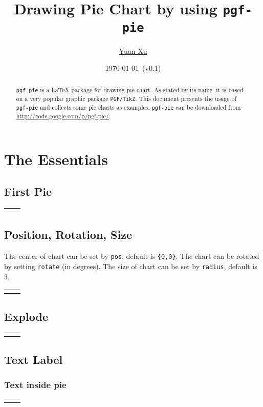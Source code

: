 \documentclass{article}
\newcommand{\demo}[2][1]{
  \begin{center}
  \begin{tabular}{cc}
    \begin{minipage}{.49\linewidth}
      \centering
      \resizebox{#1\linewidth}{!}{
        
      }
    \end{minipage}
    &
    \begin{minipage}{.45\linewidth}
      
    \end{minipage}
  \end{tabular}
  \end{center}
}
\begin{document}
\title{Drawing Pie Chart by using \texttt{pgf-pie}}
\author{\href{mailto:xuyuan.cn@gmail.com}{Yuan Xu}}
\date{\today{}~(v0.1)}
\maketitle

\begin{abstract}
  \texttt{pgf-pie} is a LaTeX package for drawing pie chart. As stated
  by its name, it is based on a very popular graphic package
  \texttt{PGF/TikZ}. This document presents the usage of
  \texttt{pgf-pie} and collects some pie charts as examples.
  \texttt{pgf-pie} can be downloaded from
  \href{http://code.google.com/p/pgf-pie/}{http://code.google.com/p/pgf-pie/}.
\end{abstract}

\tableofcontents

\section{The Essentials}

\subsection{First Pie}
\demo[0.6]{first-pie}

\subsection{Position, Rotation, Size}

The center of chart can be set by \texttt{pos}, default is
\texttt{\{0,0\}}. The chart can be rotated by setting \texttt{rotate}
(in degrees). The size of chart can be set by \texttt{radius}, default
is 3.

\demo{radius}

\subsection{Explode}
\demo{explode}

\subsection{Text Label}

\subsubsection{Text inside pie}
\demo[0.6]{before-after-number}
\end{document}
